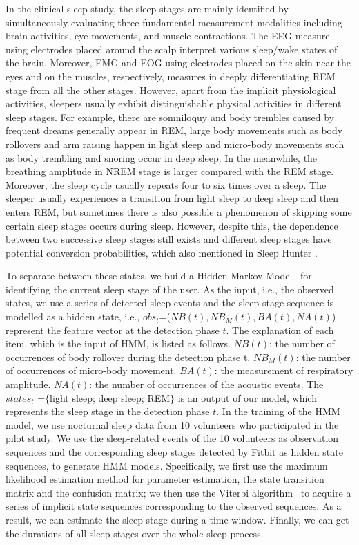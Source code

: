 In the clinical sleep study, the sleep stages are mainly identified by simultaneously evaluating three fundamental measurement modalities
including brain activities, eye movements, and muscle contractions. The EEG measure using electrodes placed around the scalp interpret
various sleep/wake states of the brain. Moreover, EMG and EOG using electrodes placed on the skin near the eyes and on the muscles,
respectively, measures in deeply differentiating REM stage from all the other stages. However, apart from the implicit physiological
activities, sleepers usually exhibit distinguishable physical activities in different sleep stages. For example, there are somniloquy and
body trembles caused by frequent dreams generally appear in REM, large body movements such as body rollovers and arm raising happen in
light sleep and micro-body movements such as body trembling and snoring occur in deep sleep.  In the meanwhile, the breathing amplitude in
NREM stage is larger compared with the REM stage. Moreover, the sleep cycle usually repeats four to six times over a sleep. The sleeper
usually experiences a transition from light sleep to deep sleep and then enters REM, but sometimes there is also possible a phenomenon of
skipping some certain sleep stages occurs during sleep. However, despite this, the dependence between two successive sleep stages still
exists and different sleep stages have potential conversion probabilities, which also mentioned in Sleep Hunter \cite{gu2016sleep}.

To separate between these states, we build a Hidden Markov Model~\cite{johnson2010hidden} for identifying the current sleep stage of the
user. As the input, i.e., the observed states, we use a series of detected sleep events and the sleep stage sequence is modelled as a
hidden state, i.e., $obs_t$=($NB(t),NB_M(t),BA(t),NA(t)$) represent the feature vector at the detection phase $t$. The explanation of each
item, which is the input of HMM, is listed as follows. $NB(t)$: the number of occurrences of body rollover during the detection phase t.
$NB_M(t)$: the number of occurrences of micro-body movement. $BA(t)$: the measurement of respiratory amplitude.  $NA(t)$: the number of
occurrences of the acoustic events. The $states_t$ =$\{$light sleep; deep sleep; REM$\}$ is an output of our model, which represents the
sleep stage in the detection phase $t$. In the training of the HMM model, we use nocturnal sleep data from 10 volunteers who participated
in the pilot study. We use the sleep-related events of the 10 volunteers as observation sequences and the corresponding sleep stages
detected by Fitbit as hidden state sequences, to generate HMM models. Specifically, we first use the maximum likelihood estimation method
for parameter estimation, the state transition matrix and the confusion matrix; we then use the Viterbi algorithm~\cite{anguera2012speaker}
to acquire a series of implicit state sequences corresponding to the observed sequences.  As a result, we can estimate the sleep stage
during a time window. Finally, we can get the durations of all sleep stages over the whole sleep process.

